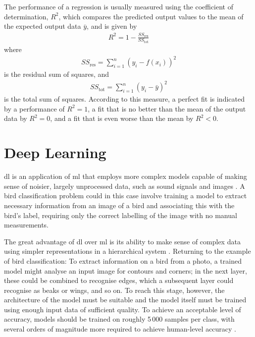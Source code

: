 The performance of a regression is usually measured using the coefficient of determination, \(R^2\), which compares the predicted output values to the mean of the expected output data \(\bar{y}\), and is given by
\begin{align}
    R^2 = 1 - \frac{SS_{\text{res}}}{SS_{\text{tot}}}
\end{align}
where
\begin{align}
    SS_{\text{res}} = \sum_{i=1}^{n}{\left(y_i - f(x_i)\right)}^2
\end{align}
is the residual sum of squares, and
\begin{align}
    SS_{\text{tot}} = \sum_{i=1}^{n}{\left(y_i - \bar{y}\right)}^2
\end{align}
is the total sum of squares. According to this measure, a perfect fit is indicated by a performance of \(R^2 = 1\), a fit that is no better than the mean of the output data by \(R^2 = 0\), and a fit that is even worse than the mean by \(R^2 < 0\).

\section{Deep Learning}
\ac{dl} is an application of \ac{ml} that employs more complex models capable of making sense of noisier, largely unprocessed data, such as sound signals and images \cite[]{goodfellow_deep_2016}. A bird classification problem could in this case involve training a model to extract necessary information from an image of a bird and associating this with the bird's label, requiring only the correct labelling of the image with no manual measurements.

The great advantage of \ac{dl} over \ac{ml} is its ability to make sense of complex data using simpler representations in a hierarchical system \cite[]{goodfellow_deep_2016}. Returning to the example of bird classification: To extract information on a bird from a photo, a trained model might analyse an input image for contours and corners; in the next layer, these could be combined to recognise edges, which a subsequent layer could recognise as beaks or wings, and so on. To reach this stage, however, the architecture of the model must be suitable and the model itself must be trained using enough input data of sufficient quality. To achieve an acceptable level of accuracy, models should be trained on roughly 5\,000 samples per class, with several orders of magnitude more required to achieve human-level accuracy \cite[p. 20]{goodfellow_deep_2016}.

